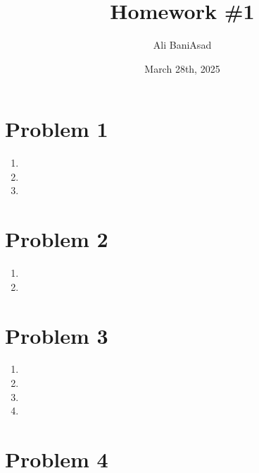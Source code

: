 \documentclass[12]{fphw}
\title{Homework \#1} %
\author{Ali BaniAsad} %
\date{March 28th, 2025} %
\institute{Sharif University of Technology \\ Institute of Aerospace} %
\begin{document}
\maketitle %
\section*{Problem 1}
\begin{enumerate}[label=(\alph*)]
	\item 
	
	\newpage
	\item 
	
	\newpage
	\item 
	
\end{enumerate}
\newpage
\section*{Problem 2}

\begin{enumerate}[label=(\alph*)]
	\item 
	
	\item 
	
\end{enumerate}


\newpage
\section*{Problem 3}

\begin{enumerate}[label=(\alph*)]
	\item 
	
	\item 
	
	\item 
	
	\item 
	
\end{enumerate}
\section*{Problem 4}

\end{document}
